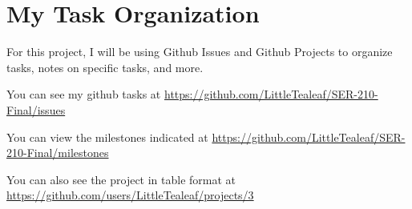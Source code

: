\documentclass{report}
\begin{document}
\newpage
\section{My Task Organization}
For this project, I will be using Github Issues and Github Projects to organize tasks, notes on specific tasks, and more.

You can see my github tasks at \href{https://github.com/LittleTealeaf/SER-210-Final/issues}{https://github.com/LittleTealeaf/SER-210-Final/issues}

You can view the milestones indicated at \href{https://github.com/LittleTealeaf/SER-210-Final/milestones}{https://github.com/LittleTealeaf/SER-210-Final/milestones}

You can also see the project in table format at \href{https://github.com/users/LittleTealeaf/projects/3}{https://github.com/users/LittleTealeaf/projects/3}
\end{document}
